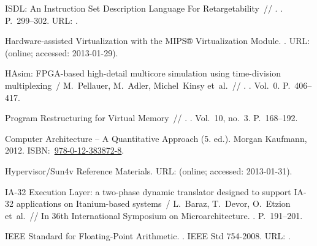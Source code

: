 \begin{thebibliography}{10}
 {{ISDL}: An Instruction Set
  Description Language For Retargetability}~// . \BibDash
{}. \BibDash
\newblock P.~299–302. \BibDash
\newblock URL:
  .

Hardware-assisted Virtualization with the {MIPS}® Virtualization Module.
  \BibDash
{}. \BibDash
\newblock URL:
  (online; accessed: 2013-01-29).

{HAsim: FPGA-based high-detail multicore simulation using time-division
  multiplexing}~/ M.~Pellauer, M.~Adler, Michel~Kinsy et~al.~//
  \href{http://dx.doi.org/10.1109/HPCA.2011.5749747}{}. \BibDash
{}. \BibDash
\newblock Vol.~0. \BibDash
\newblock P.~406–417.

 {Program Restructuring for Virtual
  Memory}~// . \BibDash
{}. \BibDash
\newblock Vol.~10, no.~3. \BibDash
\newblock P.~168–192.

 {Computer Architecture -- A
  Quantitative Approach (5. ed.)}. \BibDash
\newblock Morgan Kaufmann, 2012. \BibDash
\newblock
  ISBN:~\href{http://isbndb.com/search-all.html?kw=978-0-12-383872-8}{978-0-12-383872-8}.

{Hypervisor/Sun4v Reference Materials}. \BibDash
\newblock URL:
  (online; accessed: 2013-01-31).

{{IA-32} {Execution Layer}: a two-phase dynamic translator designed to support
  {IA}-32 applications on {Itanium}-based systems}~/ L.~Baraz, T.~Devor,
  O.~Etzion et~al.~// {In 36th International Symposium on Microarchitecture}.
  \BibDash
{}. \BibDash
\newblock P.~191–201.

{IEEE} Standard for Floating-Point Arithmetic. \BibDash
{}. \BibDash
\newblock IEEE Std 754-2008. URL:
  .


\end{thebibliography}
